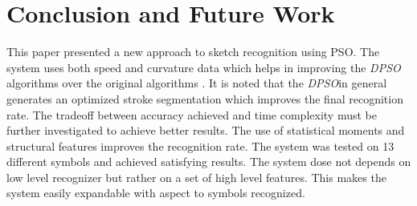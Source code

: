\documentclass{article}%
\begin{document}
% 
%		
\section{Conclusion and Future Work}
\label{ConclusionandFutureWork}
This paper presented a new approach to sketch recognition using PSO. The system uses both speed and curvature data which helps in improving the \textit{DPSO} algorithms over the original algorithms \cite{CruveDivisionSwarm,PolygonApproximationPSO}. It is noted that the \textit{DPSO}in general generates an optimized stroke segmentation which improves the final recognition rate.  The tradeoff between accuracy achieved and time complexity must be further investigated to achieve better results. The use of statistical moments and structural features improves the recognition rate. The system was tested on 13 different symbols and achieved satisfying results. The system dose not depends on low level recognizer but rather on a set of high level features. This makes the system easily expandable with aspect to symbols recognized. 
\end{document}
